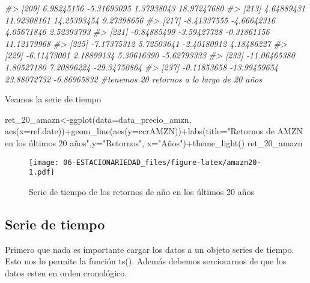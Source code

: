 \documentclass[
]{book}
\newenvironment{Shaded}{\begin{snugshade}}{\end{snugshade}}
\newcommand{\AttributeTok}[1]{\textcolor[rgb]{0.77,0.63,0.00}{#1}}
\newcommand{\CommentTok}[1]{\textcolor[rgb]{0.56,0.35,0.01}{\textit{#1}}}
\newcommand{\FunctionTok}[1]{\textcolor[rgb]{0.00,0.00,0.00}{#1}}
\newcommand{\NormalTok}[1]{#1}
\newcommand{\OtherTok}[1]{\textcolor[rgb]{0.56,0.35,0.01}{#1}}
\newcommand{\SpecialCharTok}[1]{\textcolor[rgb]{0.00,0.00,0.00}{#1}}
\newcommand{\StringTok}[1]{\textcolor[rgb]{0.31,0.60,0.02}{#1}}
\begin{document}
\begin{Shaded}
\begin{Highlighting}[]
\CommentTok{\#\textgreater{} [209]   6.98245156  {-}5.31693095   1.37938043  18.97247680}
\CommentTok{\#\textgreater{} [213]   4.64889431  11.92308161  14.25393454   9.27398656}
\CommentTok{\#\textgreater{} [217]  {-}8.41337555  {-}4.66642316   4.05671846   2.52393793}
\CommentTok{\#\textgreater{} [221]  {-}0.84885499  {-}3.59427728  {-}0.31861156  11.12179968}
\CommentTok{\#\textgreater{} [225]  {-}7.17375312   5.72503641  {-}2.40180912   4.18486227}
\CommentTok{\#\textgreater{} [229]  {-}6.11473001   2.18899134   5.30616390  {-}5.62793333}
\CommentTok{\#\textgreater{} [233] {-}11.06465380   1.80527180   7.20896224 {-}29.34750864}
\CommentTok{\#\textgreater{} [237]  {-}0.11853658 {-}13.99459654  23.88072732  {-}6.86965832}
\CommentTok{\#tenemos 20 retornos a lo largo de 20 años}
\end{Highlighting}
\end{Shaded}

Veamos la serie de tiempo

\begin{Shaded}
\begin{Highlighting}[]
\NormalTok{ret\_20\_amazn}\OtherTok{\textless{}{-}}\FunctionTok{ggplot}\NormalTok{(}\AttributeTok{data=}\NormalTok{data\_precio\_amzn, }\FunctionTok{aes}\NormalTok{(}\AttributeTok{x=}\NormalTok{ref.date))}\SpecialCharTok{+}\FunctionTok{geom\_line}\NormalTok{(}\FunctionTok{aes}\NormalTok{(}\AttributeTok{y=}\NormalTok{ccrAMZN))}\SpecialCharTok{+}\FunctionTok{labs}\NormalTok{(}\AttributeTok{title=}\StringTok{"Retornos de AMZN en los últimos 20 años"}\NormalTok{,}\AttributeTok{y=}\StringTok{"Retornos"}\NormalTok{, }\AttributeTok{x=}\StringTok{"Años"}\NormalTok{)}\SpecialCharTok{+}\FunctionTok{theme\_light}\NormalTok{()}
\NormalTok{ret\_20\_amazn}
\end{Highlighting}
\end{Shaded}

\begin{figure}
\centering
\texttt{[image: 06-ESTACIONARIEDAD\_files/figure-latex/amazn20-1.pdf]}
\caption{\label{fig:amazn20}Serie de tiempo de los retornos de año en los últimos 20 años}
\end{figure}

\hypertarget{serie-de-tiempo}{%
\subsection{Serie de tiempo}\label{serie-de-tiempo}}

Primero que nada es importante cargar los datos a un objeto series de
tiempo. Esto nos lo permite la función ts(). Además debemos serciorarnos
de que los datos esten en orden cronológico.
\end{document}
